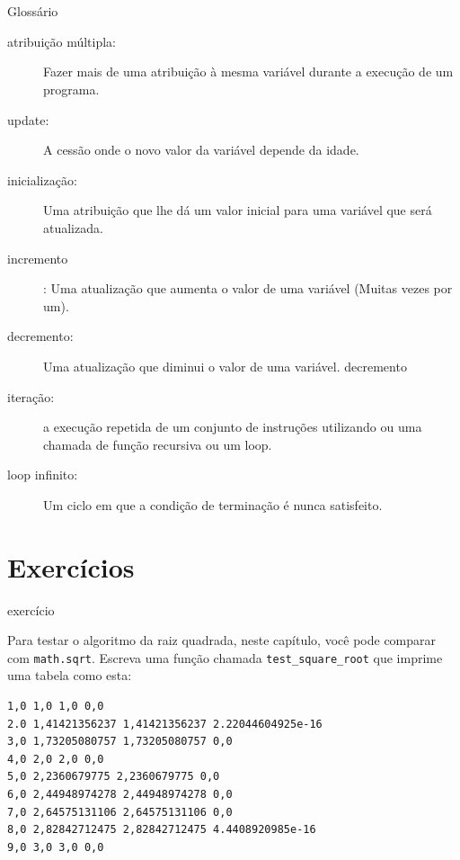\documentclass[10pt]{book}
\begin{document}
{\section{} Glossário

\begin{description}

\item[atribuição múltipla:] Fazer mais de uma atribuição à mesma
variável durante a execução de um programa.

\item[update:] A cessão onde o novo valor da variável
depende da idade.

\item[inicialização:] Uma atribuição que lhe dá um valor inicial para
uma variável que será atualizada.

\item[incremento]: Uma atualização que aumenta o valor de uma variável
(Muitas vezes por um).

\item[decremento:] Uma atualização que diminui o valor de uma variável.
\index{} decremento

\item[iteração:] a execução repetida de um conjunto de instruções utilizando
ou uma chamada de função recursiva ou um loop.

\item[loop infinito:] Um ciclo em que a condição de terminação é
nunca satisfeito.

\end{description}


\section{Exercícios}

\begin{} exercício

Para testar o algoritmo da raiz quadrada, neste capítulo, você pode comparar
com {\tt math.sqrt}. Escreva uma função chamada \verb "test_square_root"
que imprime uma tabela como esta:

\begin{verbatim}
1,0 1,0 1,0 0,0
2.0 1,41421356237 1,41421356237 2.22044604925e-16
3,0 1,73205080757 1,73205080757 0,0
4,0 2,0 2,0 0,0
5,0 2,2360679775 2,2360679775 0,0
6,0 2,44948974278 2,44948974278 0,0
7,0 2,64575131106 2,64575131106 0,0
8,0 2,82842712475 2,82842712475 4.4408920985e-16
9,0 3,0 3,0 0,0


\end{verbatim}
\end{}}
\end{document}

